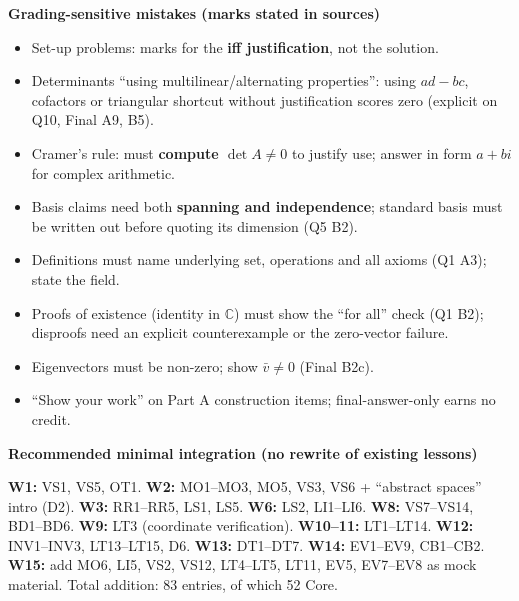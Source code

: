 \documentclass[9pt]{article}
\newcommand{\sub}[1]{\vspace{3pt}\par{\bfseries\color{NAVY}#1}\nopagebreak\par}
\begin{document}
\sub{Grading-sensitive mistakes (marks stated in sources)}
\begin{itemize}[leftmargin=1.2em,itemsep=0pt,topsep=1pt]
\item Set-up problems: marks for the \textbf{iff justification}, not the solution.
\item Determinants ``using multilinear/alternating properties'': using $ad-bc$, cofactors or triangular shortcut without justification scores zero (explicit on Q10, Final A9, B5).
\item Cramer's rule: must \textbf{compute $\det A\ne0$} to justify use; answer in form $a+bi$ for complex arithmetic.
\item Basis claims need both \textbf{spanning and independence}; standard basis must be written out before quoting its dimension (Q5 B2).
\item Definitions must name underlying set, operations and all axioms (Q1 A3); state the field.
\item Proofs of existence (identity in $\mathbb C$) must show the ``for all'' check (Q1 B2); disproofs need an explicit counterexample or the zero-vector failure.
\item Eigenvectors must be non-zero; show $\bar v\ne0$ (Final B2c).
\item ``Show your work'' on Part A construction items; final-answer-only earns no credit.
\end{itemize}
\sub{Recommended minimal integration (no rewrite of existing lessons)}
\textbf{W1:} VS1, VS5, OT1. \textbf{W2:} MO1--MO3, MO5, VS3, VS6 + ``abstract spaces'' intro (D2). \textbf{W3:} RR1--RR5, LS1, LS5. \textbf{W6:} LS2, LI1--LI6. \textbf{W8:} VS7--VS14, BD1--BD6. \textbf{W9:} LT3 (coordinate verification). \textbf{W10--11:} LT1--LT14. \textbf{W12:} INV1--INV3, LT13--LT15, D6. \textbf{W13:} DT1--DT7. \textbf{W14:} EV1--EV9, CB1--CB2. \textbf{W15:} add MO6, LI5, VS2, VS12, LT4--LT5, LT11, EV5, EV7--EV8 as mock material. Total addition: 83 entries, of which 52 Core.
\end{document}
